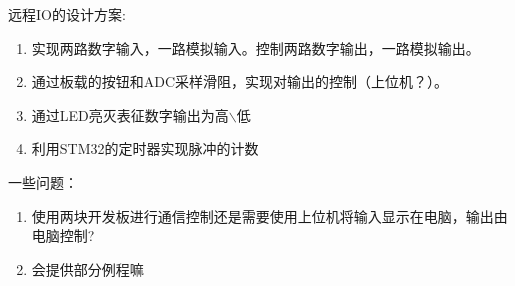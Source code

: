 \documentclass{article}
\begin{document}
远程IO的设计方案:
\begin{enumerate}
	\item 实现两路数字输入，一路模拟输入。控制两路数字输出，一路模拟输出。
	\item 通过板载的按钮和ADC采样滑阻，实现对输出的控制（上位机？）。
	\item 通过LED亮灭表征数字输出为高$\backslash$低
	\item 利用STM32的定时器实现脉冲的计数
\end{enumerate}
一些问题：
\begin{enumerate}
	\item 使用两块开发板进行通信控制还是需要使用上位机将输入显示在电脑，输出由电脑控制?
	\item 会提供部分例程嘛 
\end{enumerate}
\end{document}
